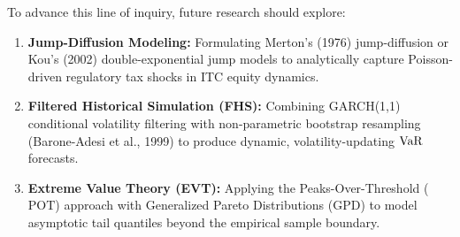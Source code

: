 To advance this line of inquiry, future research should explore:
\begin{enumerate}[label=(\alph*)]
    \item \textbf{Jump-Diffusion Modeling:} Formulating Merton's (1976) jump-diffusion or Kou's (2002) double-exponential jump models to analytically capture Poisson-driven regulatory tax shocks in ITC equity dynamics.
    \item \textbf{Filtered Historical Simulation (FHS):} Combining GARCH(1,1) conditional volatility filtering with non-parametric bootstrap resampling (Barone-Adesi et al., 1999) to produce dynamic, volatility-updating $\operatorname{VaR}$ forecasts.
    \item \textbf{Extreme Value Theory (EVT):} Applying the Peaks-Over-Threshold ($\text{POT}$) approach with Generalized Pareto Distributions ($\text{GPD}$) to model asymptotic tail quantiles beyond the empirical sample boundary.
\end{enumerate}
